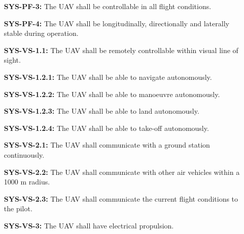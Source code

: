 \begin{enumerate}[leftmargin =4.5cm, align=parleft, labelwidth=10em]
    \item[\textbf{SYS-PF-3:}] The UAV shall be controllable in all flight conditions.
	\item[\textbf{SYS-PF-4:}] The UAV shall be longitudinally, directionally and laterally stable during operation.
    \item[\textbf{SYS-VS-1.1:}] The UAV shall be remotely controllable within visual line of sight.
    \item[\textbf{SYS-VS-1.2.1:}] The UAV shall be able to navigate  autonomously.
    \item[\textbf{SYS-VS-1.2.2:}] The UAV shall be able to manoeuvre autonomously.
    \item[\textbf{SYS-VS-1.2.3:}] The UAV shall be able to land autonomously.
    \item[\textbf{SYS-VS-1.2.4:}] The UAV shall be able to take-off autonomously.
	\item[\textbf{SYS-VS-2.1:}] The UAV shall communicate with a ground station continuously.
	\item[\textbf{SYS-VS-2.2:}] The UAV shall communicate with other air vehicles within a 1000 m radius.
	\item[\textbf{SYS-VS-2.3:}] The UAV shall communicate the current flight conditions to the pilot.
	\item[\textbf{SYS-VS-3:}] The UAV shall have electrical propulsion.
\end{enumerate}
